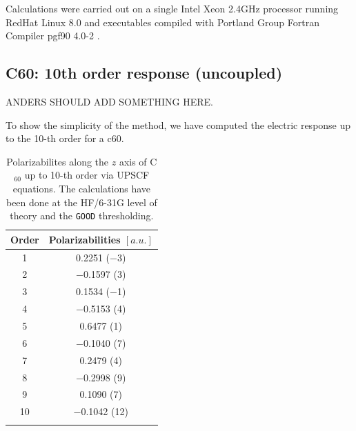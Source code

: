 \documentclass[prl,aps,twocolumn,showpacs,twocolumngrid,superbib]{revtex4}
\begin{document}
Calculations were carried out on a single Intel Xeon 2.4GHz processor 
running RedHat Linux 8.0 and  executables compiled
with Portland Group Fortran Compiler pgf90 4.0-2 \cite{PGF90}.



\subsection{C60: 10th order response (uncoupled)}
ANDERS SHOULD ADD SOMETHING HERE.




To show the simplicity of the method, we have computed 
the electric response up to the 10-th order for a c60.

\begin{table}[t]
  \centering
  \caption{\protect
    Polarizabilites along the $z$ axis of C$_{60}$ up to 10-th order via UPSCF equations.
    The calculations have been done at the HF/6-31G level of 
    theory and the {\tt GOOD} thresholding.
  }\label{tab:C60_Values}
  \begin{tabular}{cc}
    \toprule
    Order & Polarizabilities $[a.u.]$\\
    \hline
     1 &    0.2251 ($-$3)\\
     2 & $-$0.1597 (3)   \\
     3 &    0.1534 ($-$1)\\
     4 & $-$0.5153 (4)   \\
     5 &    0.6477 (1)   \\
     6 & $-$0.1040 (7)   \\
     7 &    0.2479 (4)   \\
     8 & $-$0.2998 (9)   \\
     9 &    0.1090 (7)   \\
    10 & $-$0.1042 (12)  \\
    \botrule
  \end{tabular}
\end{table}
\end{document}
